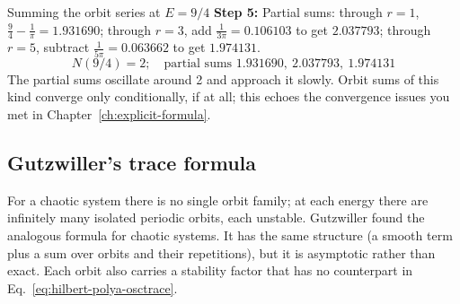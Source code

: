 \begin{sample}{Summing the orbit series at $E=9/4$}
\textbf{Step 5:} Partial sums: through $r=1$, $\tfrac94-\tfrac1\pi=1.931690$; through $r=3$, add $\tfrac{1}{3\pi}=0.106103$ to get $2.037793$; through $r=5$, subtract $\tfrac1{5\pi}=0.063662$ to get $1.974131$.
\[
\boxed{N(9/4)=2;\quad \text{partial sums }1.931690,\ 2.037793,\ 1.974131}
\]
The partial sums oscillate around 2 and approach it slowly. Orbit sums of this kind converge only conditionally, if at all; this echoes the convergence issues you met in Chapter~\ref{ch:explicit-formula}.
\end{sample}

\subsection{Gutzwiller's trace formula}

For a chaotic system there is no single orbit family; at each energy there are infinitely many isolated periodic orbits, each unstable. Gutzwiller found the analogous formula for chaotic systems. It has the same structure (a smooth term plus a sum over orbits and their repetitions), but it is asymptotic rather than exact. Each orbit also carries a stability factor that has no counterpart in Eq.~\eqref{eq:hilbert-polya-osctrace}.

